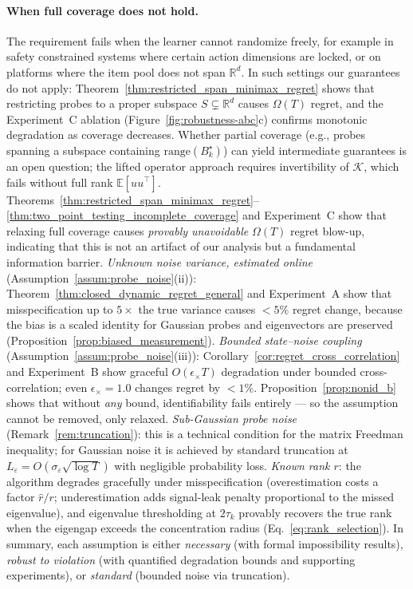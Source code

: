 \documentclass{article}
\newcommand{\R}{\mathbb{R}}
\newcommand{\E}{\mathbb{E}}
\newcommand{\range}{\mathrm{range}}
\begin{document}
    \paragraph{When full coverage does not hold.}
    The requirement fails when the learner cannot randomize freely, for example in safety constrained systems where certain
  action
    dimensions are locked, or on platforms where the item pool does not span $\R^d$.
    In such settings our guarantees do not apply: Theorem~\ref{thm:restricted_span_minimax_regret} shows that restricting
    probes to a proper subspace $S \subsetneq \R^d$ causes $\Omega(T)$ regret, and the Experiment~C ablation
    (Figure~\ref{fig:robustness-abc}c) confirms monotonic degradation as coverage decreases.
    Whether partial coverage (e.g., probes spanning a subspace containing $\range(B_k^\star)$) can yield intermediate
    guarantees is an open question; the lifted operator approach requires invertibility of $\mathcal{K}$, which fails
    without full rank $\E[uu^\top]$.
Theorems~\ref{thm:restricted_span_minimax_regret}--\ref{thm:two_point_testing_incomplete_coverage}
  and Experiment~C show that relaxing full coverage causes
  \emph{provably unavoidable} $\Omega(T)$ regret blow-up, indicating that this is not
  an artifact of our analysis but a fundamental information barrier.
  \emph{Unknown noise variance, estimated online} (Assumption~\ref{assum:probe_noise}(ii)):
  Theorem~\ref{thm:closed_dynamic_regret_general} and Experiment~A show
  that misspecification up to $5\times$ the true variance causes $<5\%$
  regret change, because the bias is a scaled identity for Gaussian probes
  and eigenvectors are preserved
  (Proposition~\ref{prop:biased_measurement}).
  \emph{Bounded state--noise coupling} (Assumption~\ref{assum:probe_noise}(iii)):
  Corollary~\ref{cor:regret_cross_correlation} and Experiment~B show
  graceful $O(\epsilon_\times T)$ degradation under bounded
  cross-correlation; even $\epsilon_\times = 1.0$ changes regret by $<1\%$.
  Proposition~\ref{prop:nonid_b} shows that without \emph{any} bound,
  identifiability fails entirely --- so the assumption cannot be removed,
  only relaxed.
  \emph{Sub-Gaussian probe noise} (Remark~\ref{rem:truncation}):
  this is a technical condition for the matrix Freedman inequality; for
  Gaussian noise it is achieved by standard truncation at
  $L_\varepsilon = O(\sigma_\varepsilon \sqrt{\log T})$ with negligible
  probability loss.
  \emph{Known rank $r$}: the algorithm degrades gracefully under
  misspecification (overestimation costs a factor $\hat{r}/r$;
  underestimation adds signal-leak penalty proportional to the missed
  eigenvalue), and eigenvalue thresholding at $2\tau_k$ provably
  recovers the true rank when the eigengap exceeds the concentration
  radius (Eq.~\eqref{eq:rank_selection}).
  In summary, each assumption is either \emph{necessary}
  (with formal impossibility results), \emph{robust to violation}
  (with quantified degradation bounds and supporting experiments), or
  \emph{standard} (bounded noise via truncation).
\end{document}
